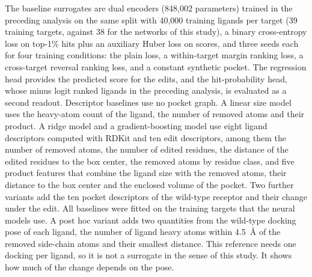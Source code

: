 The baseline surrogates are dual encoders (848,002 parameters) trained in the preceding analysis on the same split with 40,000 training ligands per target (39 training targets, against 38 for the networks of this study), a binary cross-entropy loss on top-1\% hits plus an auxiliary Huber loss on scores, and three seeds each for four training conditions: the plain loss, a within-target margin ranking loss, a cross-target reversal ranking loss, and a constant synthetic pocket. The regression head provides the predicted score for the edits, and the hit-probability head, whose minus logit ranked ligands in the preceding analysis, is evaluated as a second readout. Descriptor baselines use no pocket graph. A linear size model uses the heavy-atom count of the ligand, the number of removed atoms and their product. A ridge model and a gradient-boosting model use eight ligand descriptors computed with RDKit and ten edit descriptors, among them the number of removed atoms, the number of edited residues, the distance of the edited residues to the box center, the removed atoms by residue class, and five product features that combine the ligand size with the removed atoms, their distance to the box center and the enclosed volume of the pocket. Two further variants add the ten pocket descriptors of the wild-type receptor and their change under the edit. All baselines were fitted on the training targets that the neural models use. A post hoc variant adds two quantities from the wild-type docking pose of each ligand, the number of ligand heavy atoms within 4.5~\AA{} of the removed side-chain atoms and their smallest distance. This reference needs one docking per ligand, so it is not a surrogate in the sense of this study. It shows how much of the change depends on the pose.
